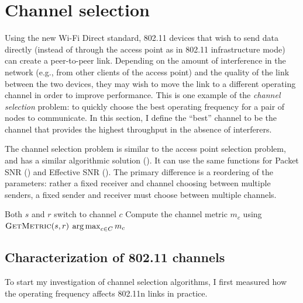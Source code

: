 \section{Channel selection}\label{sec:esnr_chansel}
Using the new Wi-Fi Direct standard, 802.11 devices that wish to send data directly (instead of through the access point as in 802.11 infrastructure mode) can create a peer-to-peer link. Depending on the amount of interference in the network (e.g., from other clients of the access point) and the quality of the link between the two devices, they may wish to move the link to a different operating channel in order to improve performance. This is one example of the \emph{channel selection} problem: to quickly choose the best operating frequency for a pair of nodes to communicate. In this section, I define the ``best'' channel to be the channel that provides the highest throughput in the absence of interferers.

The channel selection problem is similar to the access point selection problem, and has a similar algorithmic solution (). It can use the same  functions for Packet SNR () and Effective SNR (). The primary difference is a reordering of the parameters: rather a fixed receiver and channel choosing between multiple senders, a fixed sender and receiver must choose between multiple channels.

\begin{algorithm}[thp]
\caption{\label{alg:chan_sel_basic}}
\begin{algorithmic}[1]
\STATE Both $s$ and $r$ switch to channel $c$
\STATE Compute the channel metric $m_c$ using $\textsc{GetMetric}(s,r)$
\ENDFOR
\RETURN $\operatorname*{arg\,max}_{c\in C} m_c$ \hfill {}
\end{algorithmic}
\end{algorithm}

\subsection{Characterization of 802.11 channels}
To start my investigation of channel selection algorithms, I first measured how the operating frequency affects 802.11n links in practice.

